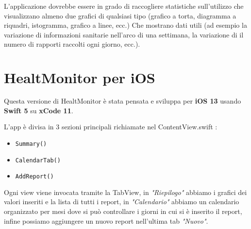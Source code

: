 \documentclass{article}
\begin{document}
L'applicazione dovrebbe essere in grado di raccogliere statistiche sull'utilizzo che visualizzano almeno due grafici di qualsiasi tipo (grafico a torta, diagramma a riquadri, istogramma, grafico a linee, ecc.) Che mostrano dati utili (ad esempio la variazione di informazioni sanitarie nell'arco di una settimana, la variazione di il numero di rapporti raccolti ogni giorno, ecc.).


\newpage
\section{HealtMonitor per iOS}

Questa versione di HealtMonitor è stata pensata e sviluppa per \textbf{iOS 13} usando \textbf{Swift 5} su \textbf{xCode 11}.

L'app è divisa in 3 sezioni principali richiamate nel ContentView.swift : 
\begin{itemize}
  \item \texttt{Summary()}
  \item \texttt{CalendarTab()}
  \item \texttt{AddReport() }
\end{itemize}

Ogni view viene invocata tramite la TabView, in \textit{"Riepilogo"} abbiamo i grafici dei valori inseriti e la lista di tutti i report, in \textit{"Calendario"} abbiamo un calendario organizzato per mesi dove si può controllare i giorni in cui si è inserito il report, infine possiamo aggiungere un nuovo report nell'ultima tab \textit{"Nuovo"}.

\medskip
\end{document}
